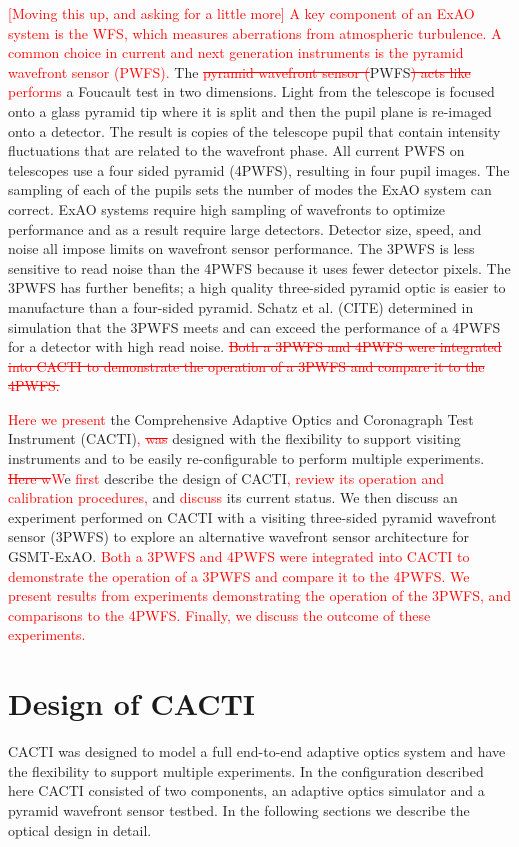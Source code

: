 \documentclass[12pt]{spieman}  %
\newcommand{\jrmadd}[1]{\textcolor{red}{#1}}
\newcommand{\jrmrmv}[1]{\textcolor{red}{\sout{#1}}}
\newcommand{\jrmcom}[1]{\textcolor{red}{[#1]}}
\begin{document}
\begin{spacing}{2}
\jrmcom{Moving this up, and asking for a little more} \jrmadd{A key component of an ExAO system is the WFS, which measures aberrations from atmospheric turbulence.  A common choice in current and next generation instruments is the pyramid wavefront sensor (PWFS).} The \jrmrmv{pyramid wavefront sensor (}PWFS\jrmrmv{) acts like}\jrmadd{ performs} a Foucault test in two dimensions. Light from the telescope is focused onto a glass pyramid tip where it is split and then the pupil plane is re-imaged onto a detector. The result is copies of the telescope pupil that contain intensity fluctuations that are related to the wavefront phase. All current PWFS on telescopes use a four sided pyramid (4PWFS), resulting in four pupil images. The sampling of each of the pupils sets the number of modes the ExAO system can correct. ExAO systems require high sampling of wavefronts to optimize performance and as a result require large detectors. Detector size, speed, and noise all impose limits on wavefront sensor performance. The 3PWFS is less sensitive to read noise than the 4PWFS because it uses fewer detector pixels. The 3PWFS has further benefits; a high quality three-sided pyramid optic is easier to manufacture than a four-sided pyramid. Schatz et al. (CITE) determined in simulation that the 3PWFS meets and can exceed the performance of a 4PWFS for a detector with high read noise.  \jrmrmv{Both a 3PWFS and 4PWFS were integrated into  CACTI to demonstrate the operation of a 3PWFS and compare it to the 4PWFS.} 

\jrmadd{Here we present} the Comprehensive Adaptive Optics and Coronagraph Test Instrument (CACTI)\jrmadd{,} \jrmrmv{was} designed with the flexibility to support visiting instruments and to be easily re-configurable to perform multiple experiments. \jrmrmv{Here w}\jrmadd{W}e \jrmadd{first} describe the design of  CACTI\jrmadd{, review its operation and calibration procedures,} and \jrmadd{discuss} its current status. We then discuss an experiment performed on CACTI with a visiting three-sided pyramid wavefront sensor (3PWFS) to explore an alternative wavefront sensor architecture for GSMT-ExAO. \jrmadd{Both a 3PWFS and 4PWFS were integrated into  CACTI to demonstrate the operation of a 3PWFS and compare it to the 4PWFS.} \jrmadd{We present results from experiments demonstrating the operation of the 3PWFS, and comparisons to the 4PWFS.  Finally, we discuss the outcome of these experiments.}


\section{Design of CACTI}
CACTI was designed to model a full end-to-end adaptive optics system and have the flexibility to support multiple experiments. In the configuration described here CACTI consisted of two components, an adaptive optics simulator and a pyramid wavefront sensor testbed. In the following sections we describe the optical design in detail. 




\end{spacing}
\end{document}
